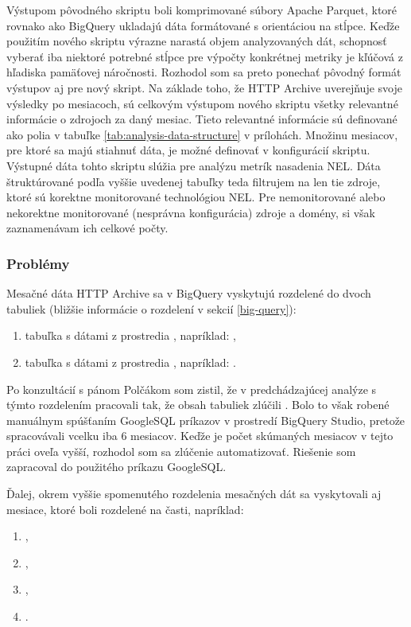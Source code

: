 Výstupom pôvodného skriptu boli komprimované súbory Apache Parquet, ktoré rovnako ako BigQuery ukladajú dáta formátované s orientáciou na stĺpce.
Keďže použitím nového skriptu výrazne narastá objem analyzovaných dát, schopnosť vyberať iba niektoré potrebné stĺpce pre výpočty konkrétnej metriky je kľúčová z hľadiska pamäťovej náročnosti.
Rozhodol som sa preto ponechať pôvodný formát výstupov aj pre nový skript. 
Na základe toho, že HTTP Archive uverejňuje svoje výsledky po mesiacoch, sú celkovým výstupom 
nového skriptu všetky relevantné informácie o zdrojoch za daný mesiac.
Tieto relevantné informácie sú definované ako polia v tabuľke \ref{tab:analysis-data-structure} v prílohách.
Množinu mesiacov, pre ktoré sa majú stiahnuť dáta, je možné definovať v konfigurácií skriptu.
Výstupné dáta tohto skriptu slúžia pre analýzu metrík nasadenia NEL.
Dáta štruktúrované podľa vyššie uvedenej tabuľky teda filtrujem na len tie zdroje, ktoré sú korektne monitorované technológiou NEL.
Pre nemonitorované alebo nekorektne monitorované (nesprávna konfigurácia) zdroje a domény, si však zaznamenávam ich celkové počty.

\subsubsection{Problémy}

Mesačné dáta HTTP Archive sa v BigQuery vyskytujú rozdelené do dvoch tabuliek (bližšie informácie o rozdelení v sekcií \ref{big-query}):
\begin{enumerate}
    \item tabuľka s dátami z prostredia , napríklad: ,
    \item tabuľka s dátami z prostredia , napríklad: .
\end{enumerate}

Po konzultácií s pánom Polčákom som zistil, že v predchádzajúcej analýze s týmto rozdelením pracovali tak, že obsah tabuliek zlúčili \cite{nel-http-archive}.
Bolo to však robené manuálnym spúšťaním GoogleSQL príkazov v prostredí BigQuery Studio, pretože spracovávali vcelku iba 6 mesiacov.
Keďže je počet skúmaných mesiacov v tejto práci oveľa vyšší, rozhodol som sa zlúčenie automatizovať.
Riešenie som zapracoval do použitého príkazu GoogleSQL.

Ďalej, okrem vyššie spomenutého rozdelenia mesačných dát sa vyskytovali aj mesiace, ktoré boli rozdelené na časti, napríklad:
\begin{enumerate}
    \item {},
    \item {},
    \item {},
    \item {}.
\end{enumerate}

